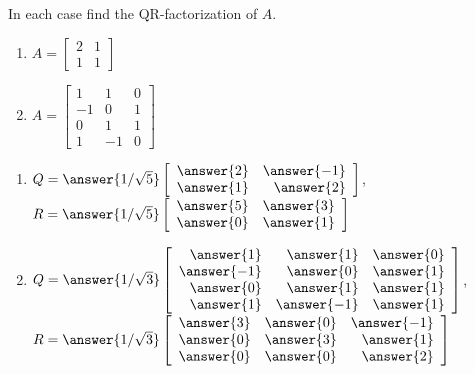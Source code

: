 \documentclass{ximera}
\author{Zack Reed}
\begin{document}
    
\begin{problem}\label{prob:findQR}
In each case find the QR-factorization of $A$.
    
\begin{enumerate}
 \item $A = \left[ \begin{array}{rr}
 2 & 1 \\
 1 &1
 \end{array}\right]$
\item $A = \left[ \begin{array}{rrr}
1 & 1 & 0 \\
-1 & 0 & 1 \\
0 & 1 & 1 \\
1 & -1 & 0
\end{array}\right]$
\end{enumerate}


\begin{enumerate}
    \item  $Q = \answer{1/\sqrt{5}}\left[ \begin{array}{rr}
    \answer{2} & \answer{-1} \\
    \answer{1} & \answer{2}
    \end{array}\right]$,
        $R = \answer{1/\sqrt{5}}\left[ \begin{array}{rr}
    \answer{5} & \answer{3} \\
    \answer{0} & \answer{1}
    \end{array}\right]$
        
    \item  $Q = \answer{1/\sqrt{3}}\left[ \begin{array}{rrr}
    \answer{1} & \answer{1} & \answer{0} \\
    \answer{-1} & \answer{0} & \answer{1} \\
    \answer{0} & \answer{1} & \answer{1} \\
    \answer{1} & \answer{-1} & \answer{1}
    \end{array}\right]$, \\
    $R = \answer{1/\sqrt{3}}\left[ \begin{array}{rrr}
    \answer{3} & \answer{0} & \answer{-1} \\
    \answer{0} & \answer{3} & \answer{1} \\
    \answer{0} & \answer{0} & \answer{2}
    \end{array}\right]$
\end{enumerate}

\end{problem}
\end{document}
